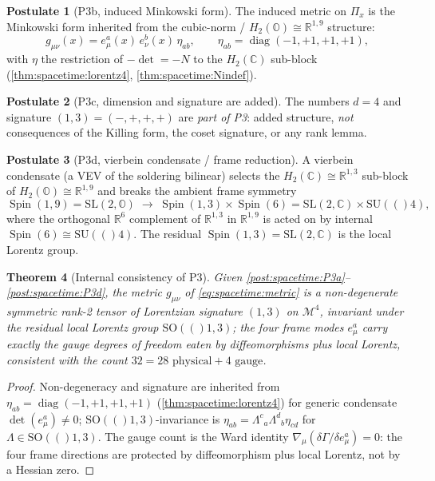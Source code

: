 \documentclass[11pt]{article}
\theoremstyle{plain}
\newtheorem{theorem}{Theorem}[section]
\theoremstyle{definition}
\newtheorem{postulate}[theorem]{Postulate}
\theoremstyle{remark}
\newcommand{\SU}[1]{\mathrm{SU}(#1)}
\newcommand{\SO}[1]{\mathrm{SO}(#1)}
\newcommand{\SL}{\mathrm{SL}}
\newcommand{\Spin}{\operatorname{Spin}}
\newcommand{\diag}{\operatorname{diag}}
\begin{document}
\begin{postulate}[P3b, induced Minkowski form]\label{post:spacetime:P3b}
The induced metric on $\Pi_x$ is the Minkowski form inherited from the cubic-norm /
$H_2(\mathbb O)\cong\mathbb R^{1,9}$ structure:
\begin{equation}\label{eq:spacetime:metric}
  g_{\mu\nu}(x)=e^a_\mu(x)\,e^b_\nu(x)\,\eta_{ab},\qquad
  \eta_{ab}=\diag(-1,+1,+1,+1),
\end{equation}
with $\eta$ the restriction of $-\det=-N$ to the $H_2(\mathbb C)$ sub-block
(\autoref{thm:spacetime:lorentz4}, \autoref{thm:spacetime:Nindef}).
\end{postulate}

\begin{postulate}[P3c, dimension and signature are added]\label{post:spacetime:P3c}
The numbers $d=4$ and signature $(1,3)=(-,+,+,+)$ are \emph{part of P3}: added
structure, \emph{not} consequences of the Killing form, the coset signature, or any
rank lemma.
\end{postulate}

\begin{postulate}[P3d, vierbein condensate / frame reduction]\label{post:spacetime:P3d}
A vierbein condensate (a VEV of the soldering bilinear) selects the
$H_2(\mathbb C)\cong\mathbb R^{1,3}$ sub-block of $H_2(\mathbb O)\cong\mathbb R^{1,9}$ and
breaks the ambient frame symmetry
\begin{equation}\label{eq:spacetime:framebreak}
  \Spin(1,9)=\SL(2,\mathbb O)\;\longrightarrow\;\Spin(1,3)\times\Spin(6)
  =\SL(2,\mathbb C)\times\SU(4),
\end{equation}
where the orthogonal $\mathbb R^6$ complement of $\mathbb R^{1,3}$ in $\mathbb R^{1,9}$
is acted on by internal $\Spin(6)\cong\SU(4)$. The residual $\Spin(1,3)=\SL(2,\mathbb C)$
is the local Lorentz group.
\end{postulate}

\begin{theorem}[Internal consistency of P3]\label{thm:spacetime:P3consistent}
\label{thm:Lorentz}
Given \autoref{post:spacetime:P3a}--\autoref{post:spacetime:P3d}, the metric
$g_{\mu\nu}$ of \eqref{eq:spacetime:metric} is a non-degenerate symmetric rank-2 tensor
of Lorentzian signature $(1,3)$ on $\mathcal M^4$, invariant under the residual local
Lorentz group $\SO(1,3)$; the four frame modes $e^a_\mu$ carry exactly the gauge
degrees of freedom eaten by diffeomorphisms plus local Lorentz, consistent with the
count $32=28\text{ physical}+4\text{ gauge}$.
\end{theorem}
\begin{proof}
Non-degeneracy and signature are inherited from $\eta_{ab}=\diag(-1,+1,+1,+1)$
(\autoref{thm:spacetime:lorentz4}) for generic condensate $\det(e^a_\mu)\ne0$;
$\SO(1,3)$-invariance is $\eta_{ab}=\Lambda^c{}_a\Lambda^d{}_b\eta_{cd}$ for
$\Lambda\in\SO(1,3)$. The gauge count is the Ward identity
$\nabla_\mu(\delta\Gamma/\delta e^a_\mu)=0$: the four frame directions are protected by
diffeomorphism plus local Lorentz, not by a Hessian zero.
\end{proof}
\end{document}
